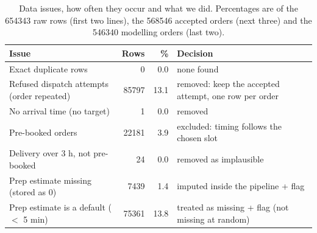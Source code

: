 \begin{table}[t]
\centering
\caption{Data issues, how often they occur and what we did. Percentages are of the \num{654343} raw rows (first two lines), the \num{568546} accepted orders (next three) and the \num{546340} modelling orders (last two).}
\label{tab:data_issues}
\footnotesize
\begin{tabular}{@{}p{}rrp{}@{}}
\toprule
Issue & Rows & \% & Decision \\
\midrule
Exact duplicate rows & \num{0} & 0.0 & none found \\
Refused dispatch attempts (order repeated) & \num{85797} & 13.1 & removed: keep the accepted attempt, one row per order \\
No arrival time (no target) & \num{1} & 0.0 & removed \\
Pre-booked orders & \num{22181} & 3.9 & excluded: timing follows the chosen slot \\
Delivery over 3 h, not pre-booked & \num{24} & 0.0 & removed as implausible \\
Prep estimate missing (stored as 0) & \num{7439} & 1.4 & imputed inside the pipeline + flag \\
Prep estimate is a default ($<$ 5 min) & \num{75361} & 13.8 & treated as missing + flag (not missing at random) \\
\bottomrule
\end{tabular}
\end{table}
